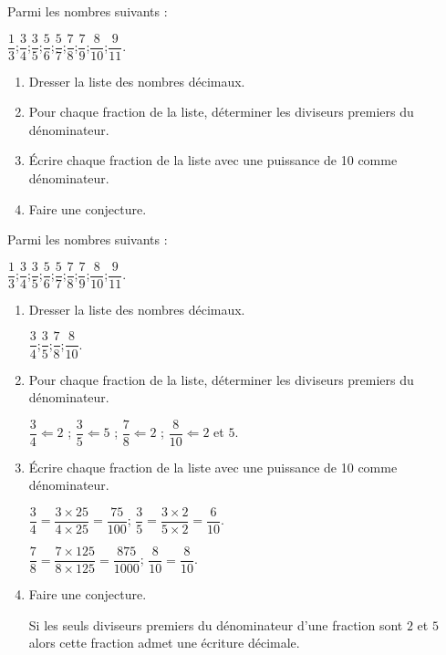 \begin{exercice*}
    Parmi les nombres suivants :

    $\dfrac{1}{3}$;\hfill$\dfrac{3}{4}$;\hfill$\dfrac{3}{5}$;\hfill$\dfrac{5}{6}$;\hfill$\dfrac{5}{7}$;\hfill$\dfrac{7}{8}$;\hfill$\dfrac{7}{9}$;\hfill$\dfrac{8}{10}$;\hfill$\dfrac{9}{11}$.\hfill
    \begin{enumerate}
        \item Dresser la liste des nombres décimaux.
        \item Pour chaque fraction de la liste, déterminer les diviseurs premiers du dénominateur.
        \item Écrire chaque fraction de la liste avec une puissance de 10 comme dénominateur.
        \item Faire une conjecture.
    \end{enumerate}
\end{exercice*}
\begin{corrige}
    Parmi les nombres suivants :

    $\dfrac{1}{3}$;\hfill$\dfrac{3}{4}$;\hfill$\dfrac{3}{5}$;\hfill$\dfrac{5}{6}$;\hfill$\dfrac{5}{7}$;\hfill$\dfrac{7}{8}$;\hfill$\dfrac{7}{9}$;\hfill$\dfrac{8}{10}$;\hfill$\dfrac{9}{11}$.\hfill

    \begin{enumerate}
        \item Dresser la liste des nombres décimaux.
        
        \smallskip
        {\red $\dfrac{3}{4}$;\hfill$\dfrac{3}{5}$;\hfill$\dfrac{7}{8}$;\hfill$\dfrac{8}{10}$.\hfill}
        \smallskip
        \item Pour chaque fraction de la liste, déterminer les diviseurs premiers du dénominateur.
        
        {\red 
            $\dfrac{3}{4} \Leftarrow 2$ ;\hfill
            $\dfrac{3}{5} \Leftarrow 5$ ;\hfill
            $\dfrac{7}{8} \Leftarrow 2$ ;\hfill
            $\dfrac{8}{10}\Leftarrow 2$ et $5$.
        }
        \item Écrire chaque fraction de la liste avec une puissance de 10 comme dénominateur.
        \begin{spacing}{1.5}            
            {\red
                $\dfrac{3}{4}=\dfrac{3\times 25}{4\times 25}=\dfrac{75}{100}$;\hfill
                $\dfrac{3}{5}=\dfrac{3\times 2}{5\times 2}=\dfrac{6}{10}$.

                $\dfrac{7}{8}=\dfrac{7\times 125}{8\times 125}=\dfrac{875}{1000}$;\hfill
                $\dfrac{8}{10}=\dfrac{8}{10}$.
            }
        \end{spacing}

        \item Faire une conjecture.
        
        {\red Si les seuls diviseurs premiers du dénominateur d'une fraction sont $2$ et $5$ alors cette fraction admet une écriture décimale.}
    \end{enumerate}
\end{corrige}

